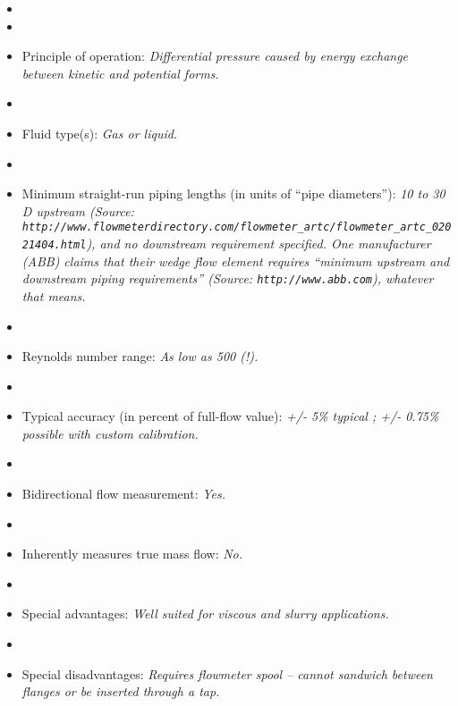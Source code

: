 \begin{itemize}
\goodbreak
\item{} 
\vskip 5pt
\item\item{} Principle of operation: {\it Differential pressure caused by energy exchange between kinetic and potential forms.}
\vskip 5pt
\item\item{} Fluid type(s): {\it Gas or liquid.}
\vskip 5pt
\item\item{} Minimum straight-run piping lengths (in units of ``pipe diameters''): {\it 10 to 30 D upstream (Source: {\tt http://www.flowmeterdirectory.com/flowmeter\_artc/flowmeter\_artc\_02021404.html}), and no downstream requirement specified.  One manufacturer (ABB) claims that their wedge flow element requires ``minimum upstream and downstream piping requirements'' (Source: {\tt http://www.abb.com}), whatever that means.}
\vskip 5pt
\item\item{} Reynolds number range: {\it As low as 500 (!).}
\vskip 5pt
\item\item{} Typical accuracy (in percent of full-flow value): {\it +/- 5\% typical ; +/- 0.75\% possible with custom calibration.}
\vskip 5pt
\item\item{} Bidirectional flow measurement: {\it Yes.}
\vskip 5pt
\item\item{} Inherently measures true mass flow: {\it No.}
\vskip 5pt
\item\item{} Special advantages: {\it Well suited for viscous and slurry applications.}
\vskip 5pt
\item\item{} Special disadvantages: {\it Requires flowmeter spool -- cannot sandwich between flanges or be inserted through a tap.}
\end{itemize}

